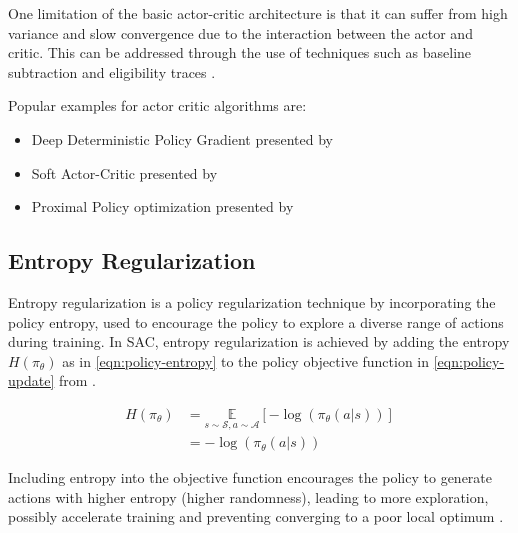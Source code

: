 One limitation of the basic actor-critic architecture is that it can suffer from high variance and slow convergence due to the interaction between the actor and critic. This can be addressed through the use of techniques such as baseline subtraction and eligibility traces \cite{SpinningUp2018} \cite{SuttonBartoRLBook}.

Popular examples for actor critic algorithms are:
\begin{itemize}
	\item Deep Deterministic Policy Gradient presented by \cite{DDPG_Paper}
	\item Soft Actor-Critic presented by \cite{SAC_Paper}
	\item Proximal Policy optimization presented by \cite{PPO_Paper}
\end{itemize}



\subsection{Entropy Regularization}\label{sec:entropy-regularization}

Entropy regularization is a policy regularization technique by incorporating the policy entropy, used to encourage the policy to explore a diverse range of actions during training. In SAC, entropy regularization is achieved by adding the entropy $H(\pi_\theta)$ as in \eqref{eqn:policy-entropy} to the policy objective function in \eqref{eqn:policy-update} from \cite{SuttonBartoRLBook}.

\begin{align}
	H(\pi_\theta) &= \underset{s\sim\mathcal{S}, a\sim\mathcal{A}}{\mathbb{E}}\left[- \log(\pi_\theta(a|s))\right] \nonumber \\
	&= -\log(\pi_\theta(a|s)) \label{eqn:policy-entropy}
\end{align}  

Including entropy into the objective function encourages the policy to generate actions with higher entropy (higher randomness), leading to more exploration, possibly accelerate training and preventing converging to a poor local optimum \cite{SpinningUp2018}.

